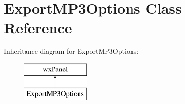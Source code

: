 \hypertarget{class_export_m_p3_options}{}\section{Export\+M\+P3\+Options Class Reference}
\label{class_export_m_p3_options}
Inheritance diagram for Export\+M\+P3\+Options\+:\begin{figure}[H]
\begin{center}
\leavevmode
\includegraphics[height=2.000000cm]{class_export_m_p3_options}
\end{center}
\end{figure}
